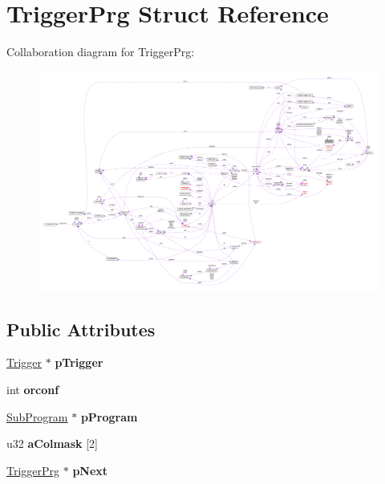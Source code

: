 \hypertarget{struct_trigger_prg}{\section{Trigger\-Prg Struct Reference}
\label{struct_trigger_prg}
}


Collaboration diagram for Trigger\-Prg\-:\nopagebreak
\begin{figure}[H]
\begin{center}
\leavevmode
\includegraphics[width=350pt]{struct_trigger_prg__coll__graph}
\end{center}
\end{figure}
\subsection*{Public Attributes}
\begin{DoxyCompactItemize}
\item 
\hypertarget{struct_trigger_prg_af70e5a74c954bc7a1eb8ee1162c40368}{\hyperlink{struct_trigger}{Trigger} $\ast$ {\bfseries p\-Trigger}}\label{struct_trigger_prg_af70e5a74c954bc7a1eb8ee1162c40368}

\item 
\hypertarget{struct_trigger_prg_aa475acda58c472b3491f6aa17020bf68}{int {\bfseries orconf}}\label{struct_trigger_prg_aa475acda58c472b3491f6aa17020bf68}

\item 
\hypertarget{struct_trigger_prg_aa770aee270c7c5df85578dc4a6686134}{\hyperlink{struct_sub_program}{Sub\-Program} $\ast$ {\bfseries p\-Program}}\label{struct_trigger_prg_aa770aee270c7c5df85578dc4a6686134}

\item 
\hypertarget{struct_trigger_prg_aeac0a4cd1f1d287981ae33c4d171b614}{u32 {\bfseries a\-Colmask} \mbox{[}2\mbox{]}}\label{struct_trigger_prg_aeac0a4cd1f1d287981ae33c4d171b614}

\item 
\hypertarget{struct_trigger_prg_a551b8a29a8c4ff785afab1596e5d8710}{\hyperlink{struct_trigger_prg}{Trigger\-Prg} $\ast$ {\bfseries p\-Next}}\label{struct_trigger_prg_a551b8a29a8c4ff785afab1596e5d8710}

\end{DoxyCompactItemize}


